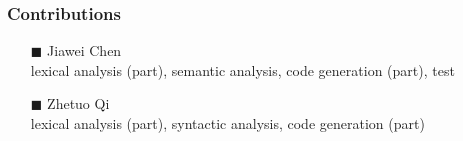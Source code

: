\documentclass{beamer}
\begin{document}
\begin{frame}
    \frametitle{Contributions}
    \begin{itemize}
        \item[$\blacksquare$] Jiawei Chen \\
        lexical analysis (part), semantic analysis, code generation (part), test
        \item[$\blacksquare$] Zhetuo Qi \\
        lexical analysis (part), syntactic analysis, code generation (part)
    \end{itemize}
\end{frame}
\end{document}
